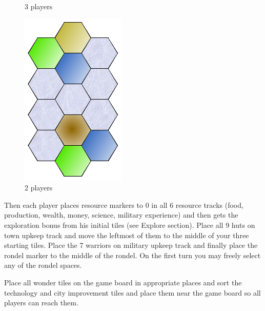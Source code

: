 \documentclass[11pt,a4paper,titlepage]{article}
\begin{document}
{\begin{figure}[!htb]
\begin{minipage}[c]{0.4\textwidth}
      \captionsetup{labelformat=empty}
      \caption{3 players}
    \end{minipage}\hfill
    \begin{minipage}[c]{0.2\textwidth}
      \includegraphics[scale=.5]{doe_2p_setup.png}
      \captionsetup{labelformat=empty}
      \caption{2 players}
    \end{minipage}\hfill
    \label{fig:tech_sailing}
  \end{figure}

  Then each player places resource markers to 0 in all 6 resource tracks
  (food, production, wealth, money, science, military experience) and then
  gets the exploration bonus from his initial tiles (see Explore section).
  Place all 9 huts on town upkeep track and move the leftmost of them
  to the middle of your three starting tiles.
  Place the 7 warriors on military upkeep track
  and finally place the rondel marker to the middle of the rondel. On the
  first turn you may freely select any of the rondel spaces.

  Place all wonder tiles on the game board in appropriate places and sort
  the technology and city improvement tiles and place them near the game
  board so all players can reach them.
}\label{sec:preparation}
\end{document}
